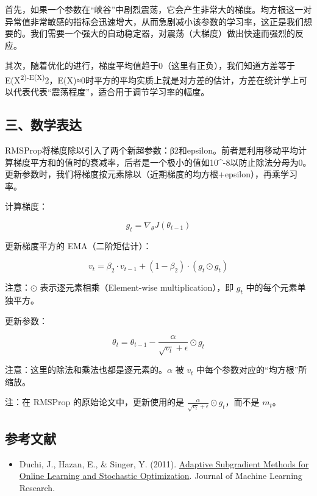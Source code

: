 首先，如果一个参数在``峡谷''中剧烈震荡，它会产生非常大的梯度。均方根这一对异常值非常敏感的指标会迅速增大，从而急剧减小该参数的学习率，这正是我们想要的。我们需要一个强大的自动稳定器，对震荡（大梯度）做出快速而强烈的反应。

其次，随着优化的进行，梯度平均值趋于0（这里有正负），我们知道方差等于E(X\textsuperscript{2)-E(X)}2，E(X)≈0时平方的平均实质上就是对方差的估计，方差在统计学上可以代表代表``震荡程度''，适合用于调节学习率的幅度。

\hypertarget{ux4e09ux6570ux5b66ux8868ux8fbe-1}{%
\subsection{三、数学表达}\label{ux4e09ux6570ux5b66ux8868ux8fbe-1}}

RMSProp将梯度除以引入了两个新超参数：β2和epsilon。前者是利用移动平均计算梯度平方和的值时的衰减率，后者是一个极小的值如10\^{}-8以防止除法分母为0。更新参数时，我们将梯度按元素除以（近期梯度的均方根+epsilon），再乘学习率。

计算梯度：

\[
g_t = \nabla_\theta J(\theta_{t-1})
\]

更新梯度平方的 EMA（二阶矩估计）：

\[
v_t = \beta_2 \cdot v_{t-1} + (1-\beta_2)\cdot (g_t \odot g_t)
\]

注意：\(\odot\) 表示逐元素相乘（Element-wise multiplication），即 \(g_t\) 中的每个元素单独平方。

更新参数：

\[
\theta_t = \theta_{t-1} - \frac{\alpha}{\sqrt{v_t}+\epsilon}\odot g_t
\]

注意：这里的除法和乘法也都是逐元素的。\(\alpha\) 被 \(v_t\) 中每个参数对应的``均方根''所缩放。

注：在 RMSProp 的原始论文中，更新使用的是 \(\frac{\alpha}{\sqrt{v_t}+\epsilon}\odot g_t\)，而不是 \(m_t\)。

\hypertarget{ux53c2ux8003ux6587ux732e-25}{%
\subsection{参考文献}\label{ux53c2ux8003ux6587ux732e-25}}

\begin{itemize}
\tightlist
\item
  Duchi, J., Hazan, E., \& Singer, Y. (2011). \href{https://jmlr.org/papers/v12/duchi11a.html}{Adaptive Subgradient Methods for Online Learning and Stochastic Optimization}. Journal of Machine Learning Research.
\end{itemize}

